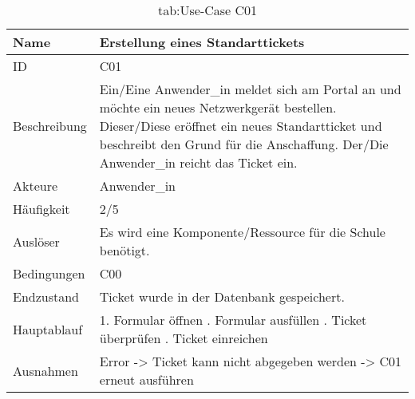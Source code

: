 \begin{table}[h]
	\begin{tabular}{|p{3cm}|p{10.7cm}|}
		\hline
		Name & Erstellung eines Standarttickets\\
		\hline
		ID & C01\\
		\hline
		Beschreibung & Ein/Eine Anwender\_in meldet sich am Portal an und möchte ein neues Netzwerkgerät bestellen. Dieser/Diese eröffnet ein neues Standartticket und beschreibt den Grund für die Anschaffung. Der/Die Anwender\_in reicht das Ticket ein.\\
		\hline
		Akteure & Anwender\_in\\
		\hline
		Häufigkeit & 2/5\\
		\hline
		Auslöser & Es wird eine Komponente/Ressource für die Schule benötigt.\\
		\hline
		Bedingungen & C00\\
		\hline
		Endzustand & Ticket wurde in der Datenbank gespeichert.\\
		\hline
		Hauptablauf & 1. Formular öffnen \newline2. Formular ausfüllen \newline3. Ticket überprüfen \newline4. Ticket einreichen\\
		\hline
		Ausnahmen & Error -> Ticket kann nicht abgegeben werden -> C01 erneut ausführen\\
		\hline
	\end{tabular}
	\caption{tab:Use-Case C01}
\end{table}
\label{tab:tab:Use-Case C01}

